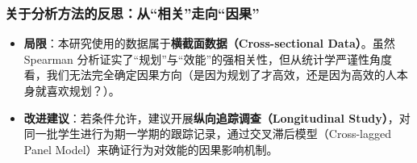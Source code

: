 \documentclass[win,thesis]{hustreport} %
\begin{document}
\subsubsection*{关于分析方法的反思：从“相关”走向“因果”}
\begin{itemize}
	\item \textbf{局限}：本研究使用的数据属于\textbf{横截面数据（Cross-sectional Data）}。虽然 Spearman 分析证实了“规划”与“效能”的强相关性，但从统计学严谨性角度看，我们无法完全确定因果方向（是因为规划了才高效，还是因为高效的人本身就喜欢规划？）。
	\item \textbf{改进建议}：若条件允许，建议开展\textbf{纵向追踪调查（Longitudinal Study）}，对同一批学生进行为期一学期的跟踪记录，通过交叉滞后模型（Cross-lagged Panel Model）来确证行为对效能的因果影响机制。
\end{itemize}
\newpage
	
	
\end{document}
